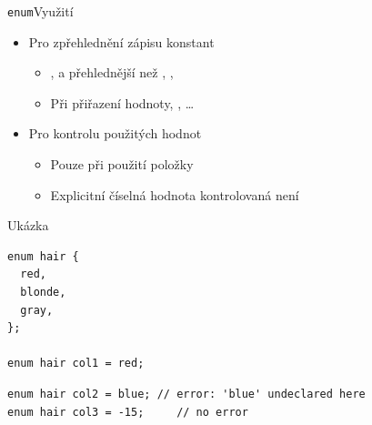 \begin{frame}[fragile]{\texttt{enum}}{Využití}

  \begin{itemize}
    \item Pro zpřehlednění zápisu konstant
    \begin{itemize}
      \item {},  a  přehlednější než ,
	, 
      \item Při přiřazení hodnoty, , \dots
    \end{itemize}

    \pause

    \item Pro kontrolu použitých hodnot
    \begin{itemize}
      \item Pouze při použití položky
      \item Explicitní číselná hodnota kontrolovaná není
    \end{itemize}

  \end{itemize}


  \begin{block}{Ukázka}
    \begin{lstlisting}[belowskip=0pt]
enum hair {
  red,
  blonde,
  gray,
};

enum hair col1 = red;
    \end{lstlisting}
    \begin{lstlisting}[aboveskip=0pt]
enum hair col2 = blue; // error: 'blue' undeclared here
enum hair col3 = -15;     // no error
    \end{lstlisting}
  \end{block}

\end{frame}

